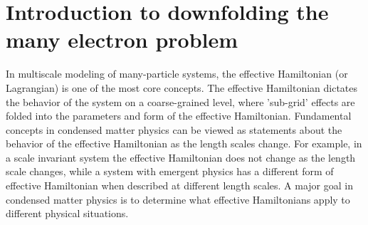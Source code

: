 \section{Introduction to downfolding the many electron problem}

In multiscale modeling of many-particle systems, the effective Hamiltonian (or Lagrangian) is one of the most core concepts. 
The effective Hamiltonian dictates the behavior of the system on a coarse-grained level, where 'sub-grid' effects are folded into the parameters and form of the effective Hamiltonian. 
Fundamental concepts in condensed matter physics can be viewed as statements about the behavior of the effective Hamiltonian as the length scales change. 
For example, in a scale invariant system the effective Hamiltonian does not change as the length scale changes, while a system with emergent physics has a different form of effective Hamiltonian when described at different length scales. 
A major goal in condensed matter physics is to determine what effective Hamiltonians apply to different physical situations. 




